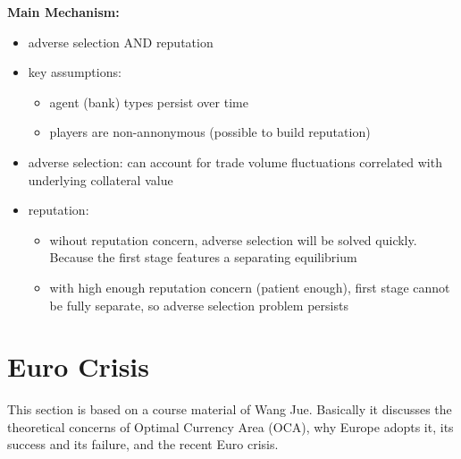 \documentclass{book}
\theoremstyle{plain}
\theoremstyle{definition}
\begin{document}
 \noindent
 \textbf{Main Mechanism:}
 \begin{itemize}
 	\item adverse selection AND reputation
 	\item key assumptions:
 	\begin{itemize}
 		\item agent (bank) types persist over time
 		\item players are non-annonymous (possible to build reputation)
 	\end{itemize}
 	\item adverse selection: can account for trade volume fluctuations correlated with underlying collateral value
 	\item reputation:
 	\begin{itemize}
 		\item wihout reputation concern, adverse selection will be solved quickly. Because the first stage features a separating equilibrium
 		\item with high enough reputation concern (patient enough), first stage cannot be fully separate, so adverse selection problem persists
 	\end{itemize}
 \end{itemize}








\section{Euro Crisis} %
\label{sec:euro_crisis}

This section is based on a course material of Wang Jue. Basically it discusses the theoretical concerns of Optimal Currency Area (OCA), why Europe adopts it, its success and its failure, and the recent Euro crisis.\\

\textbf{}
\end{document}
